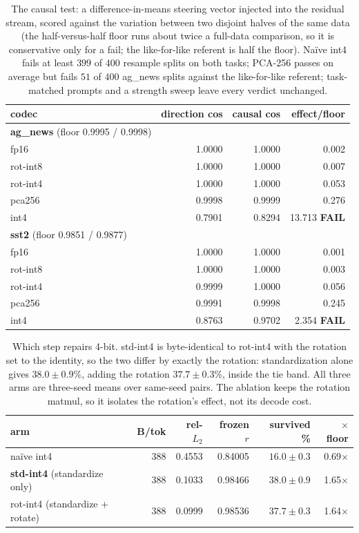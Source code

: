 \begin{table}[htbp]
\caption{The causal test: a difference-in-means steering vector injected into the residual stream, scored against the variation between two disjoint halves of the same data (the half-versus-half floor runs about twice a full-data comparison, so it is conservative only for a fail; the like-for-like referent is half the floor). Na\"ive int4 fails at least $399$ of $400$ resample splits on both tasks; PCA-256 passes on average but fails $51$ of $400$ ag\_news splits against the like-for-like referent; task-matched prompts and a strength sweep leave every verdict unchanged.}
\label{tab:steering}
\centering\small
\begin{tabular}{lrrr}
\toprule
codec & direction cos & causal cos & effect/floor \\
\midrule
\textbf{ag\_news} (floor 0.9995 / 0.9998) &  &  &  \\
fp16 & 1.0000 & 1.0000 & 0.002 \\
rot-int8 & 1.0000 & 1.0000 & 0.007 \\
rot-int4 & 1.0000 & 1.0000 & 0.053 \\
pca256 & 0.9998 & 0.9999 & 0.276 \\
int4 & 0.7901 & 0.8294 & 13.713  \textbf{FAIL} \\
\midrule
\textbf{sst2} (floor 0.9851 / 0.9877) &  &  &  \\
fp16 & 1.0000 & 1.0000 & 0.001 \\
rot-int8 & 1.0000 & 1.0000 & 0.003 \\
rot-int4 & 0.9999 & 1.0000 & 0.056 \\
pca256 & 0.9991 & 0.9998 & 0.245 \\
int4 & 0.8763 & 0.9702 & 2.354  \textbf{FAIL} \\
\bottomrule
\end{tabular}
\end{table}

\begin{table}[htbp]
\caption{Which step repairs 4-bit. std-int4 is byte-identical to rot-int4 with the rotation set to the identity, so the two differ by exactly the rotation: standardization alone gives $38.0 \pm 0.9$\%, adding the rotation $37.7 \pm 0.3$\%, inside the tie band. All three arms are three-seed means over same-seed pairs. The ablation keeps the rotation matmul, so it isolates the rotation's effect, not its decode cost.}
\label{tab:ablation}
\centering\small
\begin{tabular}{lrrrrr}
\toprule
arm & B/tok & rel-$L_2$ & frozen $r$ & survived \% & $\times$floor \\
\midrule
na\"ive int4 & 388 & 0.4553 & 0.84005 & $16.0 \pm 0.3$ & 0.69$\times$ \\
\textbf{std-int4} (standardize only) & 388 & 0.1033 & 0.98466 & $38.0 \pm 0.9$ & 1.65$\times$ \\
rot-int4 (standardize $+$ rotate) & 388 & 0.0999 & 0.98536 & $37.7 \pm 0.3$ & 1.64$\times$ \\
\bottomrule
\end{tabular}
\end{table}

